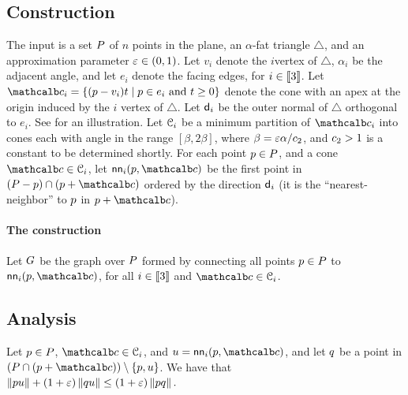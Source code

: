 \documentclass[12pt]{article}%
\begin{document}
\subsection{Construction}


The input is a set $P$ of $n$ points in the plane, an $\alpha$-fat
triangle $\triangle$, and an approximation parameter $\varepsilon \in
(0,1)$. Let $v_i$ denote the $i$\th vertex of $\triangle$, $\alpha_i$
be the adjacent angle, and let $e_i$ denote the facing edges, for
$i\in \IRX{3}$.  Let
$\cone_i = \Set{ (\pa - v_i)t }{ \pa \in e_i \text{ and } t \geq 0}$
denote the cone with an apex at the origin induced by the $i$\th
vertex of $\triangle$.  Let $\mathsf{d}_i$ be the outer normal of
$\triangle$ orthogonal to $e_i$.  See  for an
illustration. Let $\EuScript{C}_i$ be a minimum partition of $\cone_i$
into cones each with angle in the range $[\beta, 2\beta]$, where
$\beta = \varepsilon \alpha/c_2$, and $c_2>1$ is a constant to be
determined shortly.  For each point $p\in P$, and a cone
$\cone \in \ConeSet_i$, let $\nnZ{i}{\pa}{\cone}$ be the first point
in $(\PS - \pa)\cap ( \pa + \cone)$ ordered by the direction $\mathsf{d}_i$
(it is the ``nearest-neighbor'' to $p$ in $\pa+\cone$).



\paragraph{The construction}
Let $G$ be the graph over $P$ formed by connecting all points
$p \in P$ to $\nnZ{i}{\pa}{\cone}$, for all $i \in \IRX{3}$ and
$\cone \in \ConeSet_i$.




\subsection{Analysis}


\begin{lemma}
    Let $p \in P$, $\cone \in \ConeSet_i$, and
    $\pc =\nnZ{i}{\pa}{\cone}$, and let $q$ be a point in
    $(\PS \cap (\pa + \cone)) \setminus \{\pa, \pc\}$.
    We have that 
    \begin{math}
        \dY{\pa}{\pc}%
        +%
        (1+\eps)\dY{\pb}{\pc}%
        \leq%
        (1+\eps)\dY{\pa}{\pb}.
    \end{math}
\end{lemma}
\end{document}
